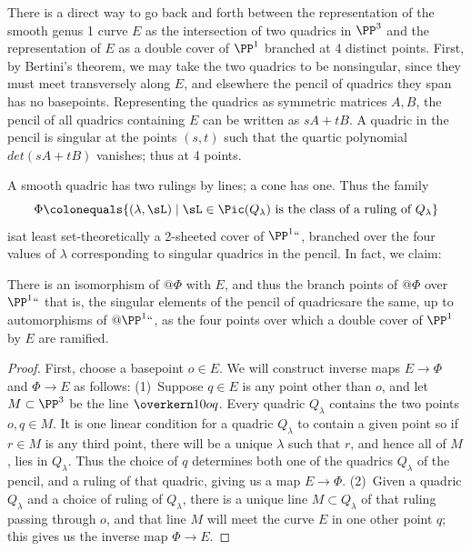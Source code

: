 There is a direct way to go back and forth between the representation of the smooth genus 1 curve $E$ as the intersection of two quadrics in $\PP^3$ and the representation of $E$ as a double cover
of $\PP^1$ branched at 4 distinct points. First, by
Bertini's theorem,
%
we may take the two quadrics to be nonsingular, since they must meet
transversely along $E$, and elsewhere the
pencil of quadrics they span has no basepoints. Representing the quadrics as symmetric matrices $A,B$, the pencil of all quadrics containing $E$ can be
written as $sA+tB$. A quadric in the pencil is singular at the points $(s,t)$ such that the quartic polynomial $det(sA+tB)$ vanishes; thus at 4 points.

A smooth quadric has two rulings by lines; a cone has one. Thus the
%
family
$$
\Phi \colonequals \{ (\lambda, \sL) \mid \sL \in \Pic(Q_\lambda) \text{ is the class of a ruling of } Q_\lambda \}
$$
is\emdash at least
set-theoretically\emdash
{}%
a 2-sheeted cover of $\PP^1` `$,
%
branched over the four values of $\lambda$ corresponding to singular
quadrics in the pencil. In fact, we claim:
%
%

\begin{proposition}\label{rulings on pencil}
There is an isomorphism of $@\Phi$ with $E$, and thus the branch points
of $@\Phi$ over $\PP^1` `$\emdash
that is, the singular elements of
the pencil of quadrics\emdash are the same, up to automorphisms of
$@\PP^1` `$, as the four points over which a double cover of $\PP^1$ by $E$
are ramified.
\unif
\end{proposition}

\begin{proof}
First, choose a basepoint $o \in E$. We will construct inverse maps $E \to \Phi$ and $\Phi \to E$ as follows:
\smallbreak\noindent
(1)\,
Suppose $q \in E$ is any point other than $o$, and let
$M\subset \PP^3$ be the line $\overkern10{oq}$.
Every quadric $Q_\lambda$ contains the two points $o, q \in M$. It is one linear condition
for a quadric $Q_{\lambda}$ to contain a given point  so if $r\in M$ is any third point, there will be a unique $\lambda$ such that $r$, and hence all of $M$, lies in $Q_\lambda$. Thus the choice of $q$ determines both one of the quadrics $Q_\lambda$ of the pencil, and a ruling of that quadric, giving us a map $E \to \Phi$.
\smallbreak\noindent
(2)\,
Given a quadric $Q_\lambda$ and a choice of ruling of $Q_\lambda$, there is a unique line $M \subset Q_\lambda$ of that ruling passing through $o$, and that line $M$ will meet the curve $E$ in one other point $q$; this gives us the inverse map $\Phi \to E$.
\end{proof}

